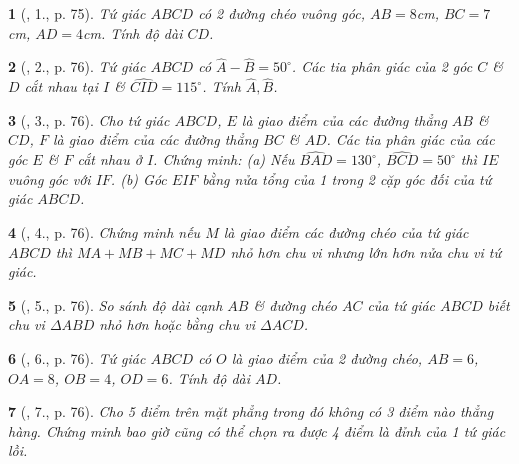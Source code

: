 \documentclass{article}
\newtheorem{baitoan}{}
\begin{document}
\begin{baitoan}[\cite{Binh_Toan_8_tap_1}, 1., p. 75]
	Tứ giác $ABCD$ có 2 đường chéo vuông góc, $AB = 8${\rm cm}, $BC = 7${\rm cm}, $AD = 4${\rm cm}. Tính độ dài $CD$.
\end{baitoan}

\begin{baitoan}[\cite{Binh_Toan_8_tap_1}, 2., p. 76]
	Tứ giác $ABCD$ có $\widehat{A} - \widehat{B} = 50^\circ$. Các tia phân giác của 2 góc $C$ \& $D$ cắt nhau tại $I$ \& $\widehat{CID} = 115^\circ$. Tính $\widehat{A},\widehat{B}$.
\end{baitoan}

\begin{baitoan}[\cite{Binh_Toan_8_tap_1}, 3., p. 76]
	Cho tứ giác $ABCD$, $E$ là giao điểm của các đường thẳng $AB$ \& $CD$, $F$ là giao điểm của các đường thẳng $BC$ \& $AD$. Các tia phân giác của các góc $E$ \& $F$ cắt nhau ở $I$. Chứng minh: (a) Nếu $\widehat{BAD} = 130^\circ$, $\widehat{BCD} = 50^\circ$ thì $IE$ vuông góc với $IF$. (b) Góc $EIF$ bằng nửa tổng của 1 trong 2 cặp góc đối của tứ giác $ABCD$.
\end{baitoan}

\begin{baitoan}[\cite{Binh_Toan_8_tap_1}, 4., p. 76]
	Chứng minh nếu $M$ là giao điểm các đường chéo của tứ giác $ABCD$ thì $MA + MB + MC + MD$ nhỏ hơn chu vi nhưng lớn hơn nửa chu vi tứ giác.
\end{baitoan}

\begin{baitoan}[\cite{Binh_Toan_8_tap_1}, 5., p. 76]
	So sánh độ dài cạnh $AB$ \& đường chéo $AC$ của tứ giác $ABCD$ biết chu vi $\Delta ABD$ nhỏ hơn hoặc bằng chu vi $\Delta ACD$.
\end{baitoan}

\begin{baitoan}[\cite{Binh_Toan_8_tap_1}, 6., p. 76]
	Tứ giác $ABCD$ có $O$ là giao điểm của 2 đường chéo, $AB = 6$, $OA = 8$, $OB = 4$, $OD = 6$. Tính độ dài $AD$.
\end{baitoan}

\begin{baitoan}[\cite{Binh_Toan_8_tap_1}, 7., p. 76]
	Cho 5 điểm trên mặt phẳng trong đó không có 3 điểm nào thẳng hàng. Chứng minh bao giờ cũng có thể chọn ra được 4 điểm là đỉnh của 1 tứ giác lồi.
\end{baitoan}

\end{document}
